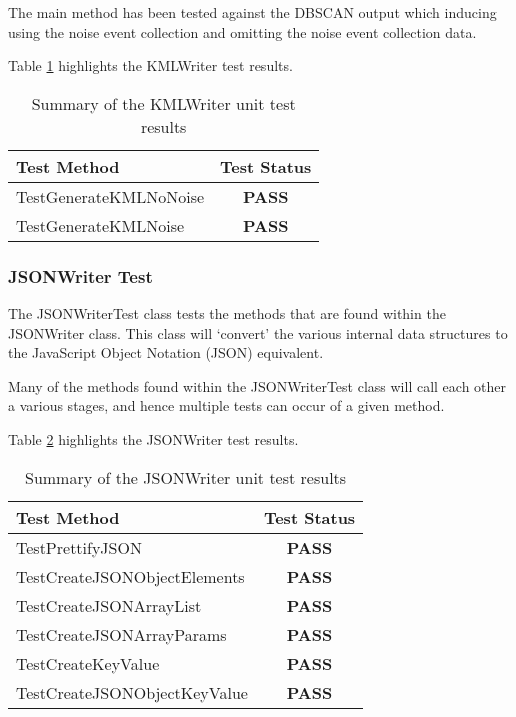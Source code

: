 The main method has been tested against the DBSCAN output which inducing using 
the noise event collection and omitting the noise event collection data.

Table \ref{tab:kml_writer_test} highlights the KMLWriter test results.

\begin{table}[h]
  \centering
  \begin{tabular}{|l|c|}
    \hline
    {\bfseries Test Method} & {\bfseries Test Status} \\ 
    \hline
    TestGenerateKMLNoNoise  & {\bfseries \color{OliveGreen} PASS}   \\ 
    TestGenerateKMLNoise    & {\bfseries \color{OliveGreen} PASS}   \\
    \hline
  \end{tabular}
  \caption[Summary of the KMLWriter unit test results]
          {Summary of the KMLWriter unit test results}
  \label{tab:kml_writer_test}
\end{table}


\subsubsection{JSONWriter Test}

The {\ttfamily JSONWriterTest} class tests the methods that are found within 
the JSONWriter class. This class will `convert' the various internal data 
structures to the JavaScript Object Notation (JSON) equivalent.

Many of the methods found within the {\ttfamily JSONWriterTest} class will call
each other a various stages, and hence multiple tests can occur of a given 
method.

Table \ref{tab:json_writer_test} highlights the JSONWriter test results.

\begin{table}[h]
  \centering
  \begin{tabular}{|l|c|}
    \hline
    {\bfseries Test Method}      & {\bfseries Test Status} \\ 
    \hline
    TestPrettifyJSON             & {\bfseries \color{OliveGreen} PASS} \\ 
    TestCreateJSONObjectElements & {\bfseries \color{OliveGreen} PASS} \\ 
    TestCreateJSONArrayList      & {\bfseries \color{OliveGreen} PASS} \\ 
    TestCreateJSONArrayParams    & {\bfseries \color{OliveGreen} PASS} \\ 
    TestCreateKeyValue           & {\bfseries \color{OliveGreen} PASS} \\ 
    TestCreateJSONObjectKeyValue & {\bfseries \color{OliveGreen} PASS} \\
    \hline
  \end{tabular}
  \caption[Summary of the JSONWriter unit test results]
          {Summary of the JSONWriter unit test results}
  \label{tab:json_writer_test}
\end{table}


